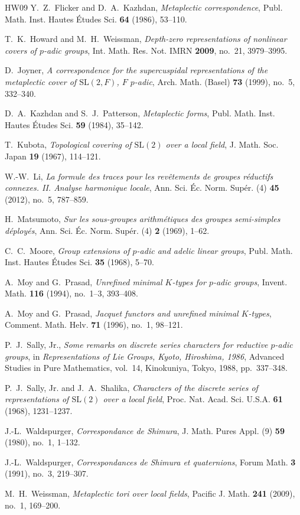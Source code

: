 \documentclass[12pt, letterpaper]{article}
\numberwithin{equation}{section}
\theoremstyle{definition}
\theoremstyle{remark}
\begin{document}
\begin{thebibliography}{HW09}
Y.~Z.~Flicker and D.~A.~Kazhdan,
\emph{Metaplectic correspondence},
Publ. Math. Inst. Hautes \'Etudes Sci. \textbf{64} (1986), 53--110.

T.~K.~Howard and M.~H.~Weissman,
\emph{Depth-zero representations of nonlinear covers of $p$-adic groups},
Int. Math. Res. Not. IMRN \textbf{2009}, no.~21, 3979--3995.

D.~Joyner,
\emph{A correspondence for the supercuspidal representations of the metaplectic cover of $\mathrm{SL}(2,F)$, $F$ $p$-adic},
Arch. Math. (Basel) \textbf{73} (1999), no.~5, 332--340.

D.~A.~Kazhdan and S.~J.~Patterson,
\emph{Metaplectic forms},
Publ. Math. Inst. Hautes \'Etudes Sci. \textbf{59} (1984), 35--142.

T.~Kubota,
\emph{Topological covering of $\mathrm{SL}(2)$ over a local field},
J. Math. Soc. Japan \textbf{19} (1967), 114--121.

W.-W.~Li,
\emph{La formule des traces pour les rev\^etements de groupes r\'eductifs connexes. II. Analyse harmonique locale},
Ann. Sci. \'Ec. Norm. Sup\'er. (4) \textbf{45} (2012), no.~5, 787--859.

H.~Matsumoto,
\emph{Sur les sous-groupes arithm\'etiques des groupes semi-simples d\'eploy\'es},
Ann. Sci. \'Ec. Norm. Sup\'er. (4) \textbf{2} (1969), 1--62.

C.~C.~Moore,
\emph{Group extensions of $p$-adic and adelic linear groups},
Publ. Math. Inst. Hautes \'Etudes Sci. \textbf{35} (1968), 5--70.

A.~Moy and G.~Prasad,
\emph{Unrefined minimal $K$-types for $p$-adic groups},
Invent. Math. \textbf{116} (1994), no.~1--3, 393--408.

A.~Moy and G.~Prasad,
\emph{Jacquet functors and unrefined minimal $K$-types},
Comment. Math. Helv. \textbf{71} (1996), no.~1, 98--121.

P.~J.~Sally, Jr.,
\emph{Some remarks on discrete series characters for reductive $p$-adic groups},
in \emph{Representations of Lie Groups, Kyoto, Hiroshima, 1986}, Advanced Studies in Pure Mathematics, vol.~14, Kinokuniya, Tokyo, 1988, pp.~337--348.

P.~J.~Sally, Jr. and J.~A.~Shalika,
\emph{Characters of the discrete series of representations of $\mathrm{SL}(2)$ over a local field},
Proc. Nat. Acad. Sci. U.S.A. \textbf{61} (1968), 1231--1237.

J.-L.~Waldspurger,
\emph{Correspondance de Shimura},
J. Math. Pures Appl. (9) \textbf{59} (1980), no.~1, 1--132.

J.-L.~Waldspurger,
\emph{Correspondances de Shimura et quaternions},
Forum Math. \textbf{3} (1991), no.~3, 219--307.

M.~H.~Weissman,
\emph{Metaplectic tori over local fields},
Pacific J. Math. \textbf{241} (2009), no.~1, 169--200.
\end{thebibliography}
\end{document}
